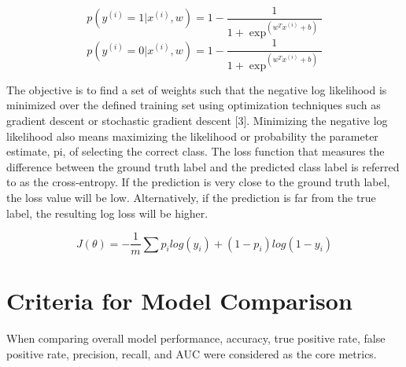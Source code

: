 \documentclass{llncs}
\begin{document}
\begin{equation}
p(y^{(i)} = 1 | x^{(i)},w) = 1-  \frac{1}{1+\exp^{(w^{T}x^{(i)}+b)}}
\end{equation}
\begin{equation}
p(y^{(i)} = 0 | x^{(i)},w) = 1-  \frac{1}{1+\exp^{(w^{T}x^{(i)}+b)}}
\end{equation}


The objective is to find a set of weights such that the negative log likelihood is minimized over the defined training set using optimization techniques such as gradient descent or stochastic gradient descent [3]. Minimizing the negative log likelihood also means maximizing the likelihood or probability the parameter estimate, pi, of selecting the correct class. The loss function that measures the difference between the ground truth label and the predicted class label is referred to as the cross-entropy. If the prediction is very close to the ground truth label, the loss value will be low. Alternatively, if the prediction is far from the true label, the resulting log loss will be higher.

\begin{equation}
J(\theta) = -\frac{1}{m}\sum p_{i}log(y_{i}) + (1-p_{i})log(1-y_{i})
\end{equation}

\section{Criteria for Model Comparison}

When comparing overall model performance, accuracy, true positive rate, false positive rate, precision, recall, and AUC were considered as the core metrics.
\end{document}
